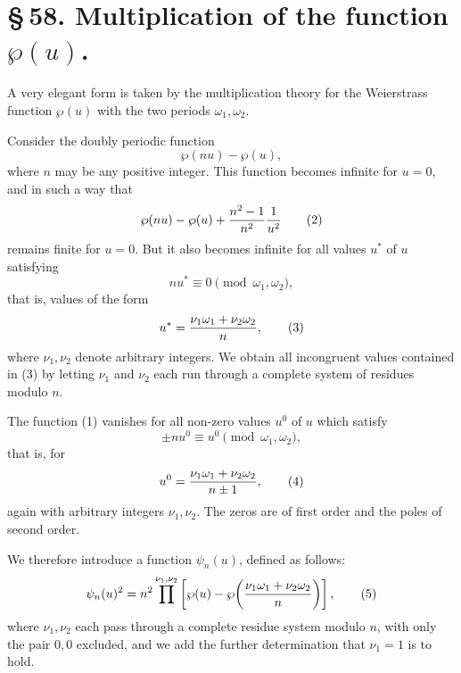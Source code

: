 \documentclass[11pt]{article}
\begin{document}
\section*{\S\,58. Multiplication of the function $\wp(u)$.}

A very elegant form is taken by the multiplication theory for the Weierstrass function
$\wp(u)$ with the two periods $\omega_1,\omega_2$.

Consider the doubly periodic function
\begin{equation}
\wp(nu)-\wp(u),
\tag{1}
\end{equation}
where $n$ may be any positive integer. This function becomes infinite for $u=0$, and in
such a way that
\begin{equation}
\wp(nu)-\wp(u)+{n^2-1\over n^2}{1\over u^2}
\tag{2}
\end{equation}
remains finite for $u=0$. But it also becomes infinite for all values $u^*$ of $u$ satisfying
\[
nu^*\equiv 0\pmod{\omega_1,\omega_2},
\]
that is, values of the form
\begin{equation}
u^*={\nu_1\omega_1+\nu_2\omega_2\over n},
\tag{3}
\end{equation}
where $\nu_1,\nu_2$ denote arbitrary integers. We obtain all incongruent values contained
in (3) by letting $\nu_1$ and $\nu_2$ each run through a complete system of residues
modulo $n$.

The function (1) vanishes for all non-zero values $u^0$ of $u$ which satisfy
\[
\pm n u^0\equiv u^0\pmod{\omega_1,\omega_2},
\]
that is, for
\begin{equation}
u^0={\nu_1\omega_1+\nu_2\omega_2\over n\pm1},
\tag{4}
\end{equation}
again with arbitrary integers $\nu_1,\nu_2$. The zeros are of first order and the poles of
second order.

We therefore introduce a function $\psi_n(u)$, defined as follows:
\begin{equation}
\psi_n(u)^2=n^2\prod^{\nu_1,\nu_2}
\left[\wp(u)-\wp\!\left({\nu_1\omega_1+\nu_2\omega_2\over n}\right)\right],
\tag{5}
\end{equation}
where $\nu_1,\nu_2$ each pass through a complete residue system modulo $n$, with only the
pair $0,0$ excluded, and we add the further determination that $\nu_1=1$ is to hold.
\end{document}
